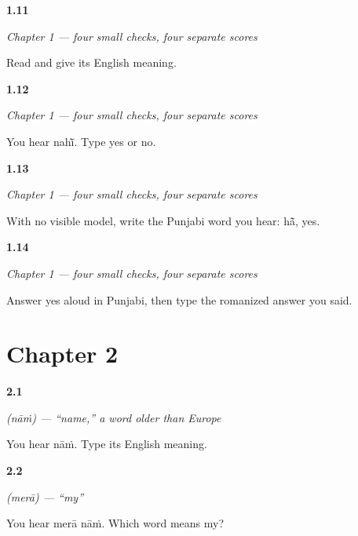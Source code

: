 \noindent\begin{minipage}[t]{\linewidth}
\raggedright
\hypertarget{review-PA-C01-practice-reading}{\textbf{1.11}} \emph{Chapter 1 — four small checks, four separate scores}\par
\small Read  and give its English meaning.
\end{minipage}\par\medskip

\noindent\begin{minipage}[t]{\linewidth}
\raggedright
\hypertarget{review-PA-C01-practice-listening}{\textbf{1.12}} \emph{Chapter 1 — four small checks, four separate scores}\par
\small You hear nahī̃. Type yes or no.
\end{minipage}\par\medskip

\noindent\begin{minipage}[t]{\linewidth}
\raggedright
\hypertarget{review-PA-C01-practice-writing}{\textbf{1.13}} \emph{Chapter 1 — four small checks, four separate scores}\par
\small With no visible model, write the Punjabi word you hear: hā̃, yes.
\end{minipage}\par\medskip

\noindent\begin{minipage}[t]{\linewidth}
\raggedright
\hypertarget{review-PA-C01-practice-speaking}{\textbf{1.14}} \emph{Chapter 1 — four small checks, four separate scores}\par
\small Answer yes aloud in Punjabi, then type the romanized answer you said.
\end{minipage}\par\medskip

\section*{Chapter 2}

\noindent\begin{minipage}[t]{\linewidth}
\raggedright
\hypertarget{review-PA-C02-naam-meaning}{\textbf{2.1}} \emph{ (nāṁ) — \textquotedblleft{}name,\textquotedblright{} a word older than Europe}\par
\small You hear nāṁ. Type its English meaning.
\end{minipage}\par\medskip

\noindent\begin{minipage}[t]{\linewidth}
\raggedright
\hypertarget{review-PA-C02-mera-meaning}{\textbf{2.2}} \emph{ (merā) — \textquotedblleft{}my\textquotedblright{}}\par
\small You hear merā nāṁ. Which word means my?
\end{minipage}\par\medskip

